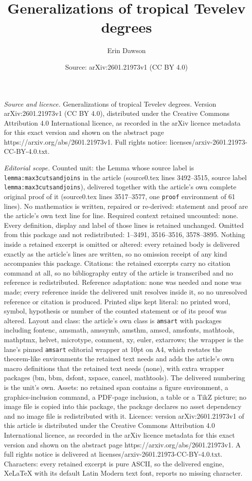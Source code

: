 \documentclass[10pt,a4paper]{amsart}
\title[Generalizations of tropical Tevelev degrees]{Generalizations of tropical Tevelev degrees}
\author{Erin Dawson}
\date{Source: arXiv:2601.21973v1 (CC BY 4.0)}
\begin{document}
\maketitle

\noindent\emph{Source and licence.} Generalizations of tropical Tevelev degrees. Version arXiv:2601.21973v1 (CC BY 4.0), distributed under the Creative Commons Attribution 4.0 International licence, as recorded in the arXiv licence metadata for this exact version and shown on the abstract page https://arxiv.org/abs/2601.21973v1. Full rights notice: licenses/arxiv-2601.21973-CC-BY-4.0.txt.\par\smallskip

\noindent\textit{Editorial scope.} Counted unit: the Lemma whose source label is \texttt{lemma:max3cutsandjoins} in the article (source0.tex lines 3492--3515, source label \texttt{lemma:max3cutsandjoins}), delivered together with the article's own complete original proof of it (source0.tex lines 3517--3577, one \texttt{proof} environment of 61 lines). No mathematics is written, repaired or re-derived: statement and proof are the article's own text line for line. Required context retained uncounted: none. Every definition, display and label of those lines is retained unchanged. Omitted from this package and not redistributed: 1--3491, 3516--3516, 3578--3895. Nothing inside a retained excerpt is omitted or altered: every retained body is delivered exactly as the article's lines are written, so no omission receipt of any kind accompanies this package. Citations: the retained excerpts carry no citation command at all, so no bibliography entry of the article is transcribed and no reference is redistributed. Reference adaptation: none was needed and none was made; every reference inside the delivered unit resolves inside it, so no unresolved reference or citation is produced. Printed slips kept literal: no printed word, symbol, hypothesis or number of the counted statement or of its proof was altered. Layout and class: the article's own class is \texttt{amsart} with packages including fontenc, amsmath, amssymb, amsthm, amscd, amsfonts, mathtools, mathptmx, helvet, microtype, comment, xy, euler, extarrows; the wrapper is the lane's pinned \texttt{amsart} editorial wrapper at 10pt on A4, which restates the theorem-like environments the retained text needs and adds the article's own macro definitions that the retained text needs (none), with extra wrapper packages (bm, bbm, dsfont, xspace, cancel, mathtools). The delivered numbering is the unit's own. Assets: no retained span contains a figure environment, a graphics-inclusion command, a PDF-page inclusion, a table or a TikZ picture; no image file is copied into this package, the package declares no asset dependency and no image file is redistributed with it. Licence: version arXiv:2601.21973v1 of this article is distributed under the Creative Commons Attribution 4.0 International licence, as recorded in the arXiv licence metadata for this exact version and shown on the abstract page https://arxiv.org/abs/2601.21973v1. A full rights notice is delivered at licenses/arxiv-2601.21973-CC-BY-4.0.txt. Characters: every retained excerpt is pure ASCII, so the delivered engine, XeLaTeX with its default Latin Modern text font, reports no missing character.
\end{document}
